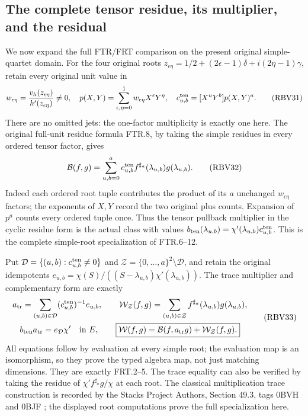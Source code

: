 \subsection{The complete tensor residue, its multiplier, and the residual}
We now expand the full FTR/FRT comparison on the present original
simple-quartet domain. For the four original roots
$z_{\epsilon\eta}=1/2+(2\epsilon-1)\delta+i(2\eta-1)\gamma$,
retain every original unit value in
\[
w_{\epsilon\eta}=\frac{v_h(z_{\epsilon\eta})}{h'(z_{\epsilon\eta})}\ne0,
\quad p(X,Y)=\sum_{\epsilon,\eta=0}^1w_{\epsilon\eta}X^\epsilon Y^\eta,
\quad c_{u,b}^{\rm ten}=[X^uY^b]p(X,Y)^a.
\tag{RBV31}
\]
There are no omitted jets: the one-factor multiplicity is exactly
one here. The original full-unit residue formula FTR.8, by taking
the simple residues in every ordered tensor factor, gives
\[
\mathcal B(f,g)=\sum_{u,b=0}^a
c_{u,b}^{\rm ten} f^{\sharp_a}(\lambda_{u,b})g(\lambda_{u,b}).
\tag{RBV32}
\]
Indeed each ordered root tuple contributes the product of its
$a$ unchanged $w_{\epsilon\eta}$ factors; the exponents of $X,Y$
record the two original plus counts. Expansion of $p^a$ counts
every ordered tuple once. Thus the tensor pullback multiplier in
the cyclic residue form is the actual class with values
$b_{\rm ten}(\lambda_{u,b})=\chi'(\lambda_{u,b})c_{u,b}^{\rm ten}$.
This is the complete simple-root specialization of FTR.6--12.

Put $\mathcal D=\{(u,b):c_{u,b}^{\rm ten}\ne0\}$ and
$\mathcal Z=\{0,\ldots,a\}^2\setminus\mathcal D$, and retain the
original idempotents
$e_{u,b}=\chi(S)/((S-\lambda_{u,b})\chi'(\lambda_{u,b}))$.
The trace multiplier and complementary form are exactly
\[
\begin{gathered}
a_{\rm tr}=\sum_{(u,b)\in\mathcal D}
              (c_{u,b}^{\rm ten})^{-1}e_{u,b},\qquad
\mathcal W_{\mathcal Z}(f,g)=\sum_{(u,b)\in\mathcal Z}
              f^{\sharp_a}(\lambda_{u,b})g(\lambda_{u,b}),\\
b_{\rm ten}a_{\rm tr}=e_{\mathcal D}\chi'\quad\text{in }E,
\qquad
\boxed{\mathcal W(f,g)=\mathcal B(f,a_{\rm tr}g)
                              +\mathcal W_{\mathcal Z}(f,g).}
\end{gathered}\tag{RBV33}
\]
All equations follow by evaluation at every simple root; the
evaluation map is an isomorphism, so they prove the typed algebra
map, not just matching dimensions. They are exactly FRT.2--5.
The trace equality can also be verified by taking the residue of
$\chi'f^{\sharp_a}g/\chi$ at each root. The classical multiplication
trace construction is recorded by the Stacks Project Authors,
Section 49.3, tags 0BVH and 0BJF \cite{a03rp:human:stacks-trace}; the
displayed root computations prove the full specialization here.

